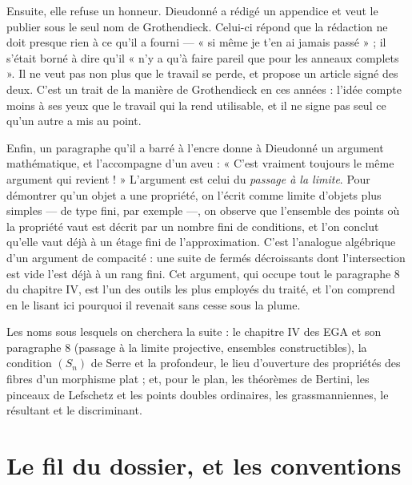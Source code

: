 \documentclass[11pt,a4paper]{article}
\begin{document}
\begin{resume}
Ensuite, elle refuse un honneur. Dieudonné a rédigé un appendice et veut le
publier sous le seul nom de Grothendieck. Celui-ci répond que la rédaction ne
doit presque rien à ce qu'il a fourni — « si même je t'en ai jamais passé » ;
il s'était borné à dire qu'il « n'y a qu'à faire pareil que pour les anneaux
complets ». Il ne veut pas non plus que le travail se perde, et propose un
article signé des deux. C'est un trait de la manière de Grothendieck en ces
années : l'idée compte moins à ses yeux que le travail qui la rend utilisable,
et il ne signe pas seul ce qu'un autre a mis au point.

Enfin, un paragraphe qu'il a barré à l'encre donne à Dieudonné un argument
mathématique, et l'accompagne d'un aveu : « C'est vraiment toujours le même
argument qui revient ! » L'argument est celui du \emph{passage à la limite}.
Pour démontrer qu'un objet a une propriété, on l'écrit comme limite d'objets
plus simples — de type fini, par exemple —, on observe que l'ensemble des
points où la propriété vaut est décrit par un nombre fini de conditions, et
l'on conclut qu'elle vaut déjà à un étage fini de l'approximation. C'est
l'analogue algébrique d'un argument de compacité : une suite de fermés
décroissants dont l'intersection est vide l'est déjà à un rang fini. Cet
argument, qui occupe tout le paragraphe 8 du chapitre IV, est l'un des outils
les plus employés du traité, et l'on comprend en le lisant ici pourquoi il
revenait sans cesse sous la plume.

Les noms sous lesquels on cherchera la suite : le chapitre IV des EGA et son
paragraphe 8 (passage à la limite projective, ensembles constructibles), la
condition $(S_n)$ de Serre et la profondeur, le lieu d'ouverture des propriétés
des fibres d'un morphisme plat ; et, pour le plan, les théorèmes de Bertini, les
pinceaux de Lefschetz et les points doubles ordinaires, les grassmanniennes, le
résultant et le discriminant.

\end{resume}

\section*{Le fil du dossier, et les conventions}
\end{document}
